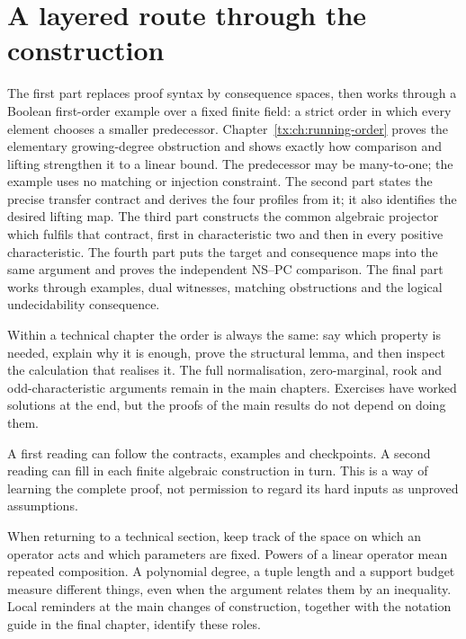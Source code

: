 \section*{A layered route through the construction}
The first part replaces proof syntax by consequence spaces, then works
through a Boolean first-order example over a fixed finite field: a
strict order in which every element chooses a smaller predecessor.
Chapter~\ref{tx:ch:running-order} proves the elementary growing-degree
obstruction and shows exactly how comparison and lifting strengthen it
to a linear bound. The predecessor may be many-to-one; the example
uses no matching or injection constraint. The second
part states the precise transfer contract and derives the four profiles
from it; it also identifies the desired lifting map. The third part
constructs the common algebraic projector which fulfils that contract,
first in characteristic two and then in every positive characteristic.
The fourth part puts the target and consequence maps into the same
argument and proves the independent NS--PC comparison. The final part
works through examples, dual witnesses, matching obstructions and the
logical undecidability consequence.

Within a technical chapter the order is always the same: say which
property is needed, explain why it is enough, prove the structural
lemma, and then inspect the calculation that realises it. The full
normalisation, zero-marginal, rook and odd-characteristic arguments
remain in the main chapters. Exercises have worked solutions at the
end, but the proofs of the main results do not depend on doing them.

A first reading can follow the contracts, examples and checkpoints.
A second reading can fill in each finite algebraic construction in turn.
This is a way of learning the complete proof, not permission to regard
its hard inputs as unproved assumptions.

When returning to a technical section, keep track of the space on
which an operator acts and which parameters are fixed. Powers of a
linear operator mean repeated composition. A polynomial degree, a
tuple length and a support budget measure different things, even
when the argument relates them by an inequality. Local reminders at
the main changes of construction, together with the notation guide
in the final chapter, identify these roles.

